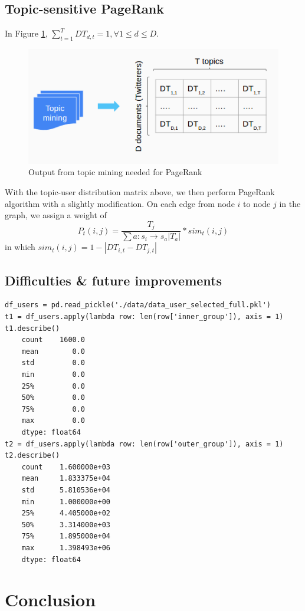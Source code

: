 \documentclass[11pt]{article}
\begin{document}
\subsection{Topic-sensitive PageRank}

In Figure \ref{fig:topic_2_pagerank}, $\sum_{t=1}^{T}{DT_{d,t}} = 1, \forall 1\le d\le D$.

\begin{figure}[ht]
	\centering
	\includegraphics[scale=0.7]{topic_2_pagerank}
	\caption{Output from topic mining needed for PageRank}
	\label{fig:topic_2_pagerank}
\end{figure}

With the topic-user distribution matrix above, we then perform PageRank algorithm with a slightly modification. On each edge from node $i$ to node $j$ in the graph, we assign a weight of
\[P_t(i,j)=\frac{T_j}{\sum{a:s_i\to s_a|T_a|}}*sim_t(i,j)\]
in which $sim_t(i,j)=1-|DT_{i,t}-DT_{j,t}|$

\subsection{Difficulties \& future improvements}
\begin{listing}[H]
    \begin{verbatim}
df_users = pd.read_pickle('./data/data_user_selected_full.pkl')
t1 = df_users.apply(lambda row: len(row['inner_group']), axis = 1)
t1.describe()
    count    1600.0
    mean        0.0
    std         0.0
    min         0.0
    25%         0.0
    50%         0.0
    75%         0.0
    max         0.0
    dtype: float64
t2 = df_users.apply(lambda row: len(row['outer_group']), axis = 1)
t2.describe()
    count    1.600000e+03
    mean     1.833375e+04
    std      5.810536e+04
    min      1.000000e+00
    25%      4.405000e+02
    50%      3.314000e+03
    75%      1.895000e+04
    max      1.398493e+06
    dtype: float64
    \end{verbatim}
\end{listing}

\section{Conclusion}



\end{document}
